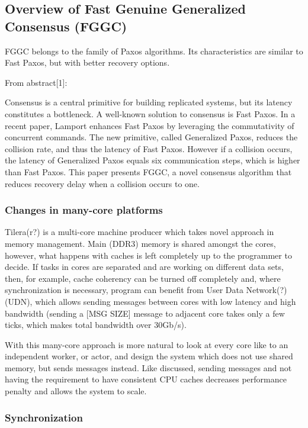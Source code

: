 \documentclass[english,11pt]{article}
\begin{document}
\subsection{Overview of Fast Genuine Generalized Consensus (FGGC)}

FGGC belongs to the family of Paxos algorithms. Its characteristics are similar
to Fast Paxos, but with better recovery options.

From abstract[1]:

Consensus is a central primitive for building replicated systems, but its
latency constitutes a bottleneck. A well-known solution to consensus is Fast
Paxos. In a recent paper, Lamport enhances Fast Paxos by leveraging the
commutativity of concurrent commands. The new primitive, called Generalized
Paxos, reduces the collision rate, and thus the latency of Fast Paxos. However
if a collision occurs, the latency of Generalized Paxos equals six
communication steps, which is higher than Fast Paxos. This paper presents FGGC,
a novel consensus algorithm that reduces recovery delay when a collision occurs
to one.

\subsubsection{Changes in many-core platforms}
\label{many-core}

Tilera(r?) is a multi-core machine producer which takes novel approach in
memory management. Main (DDR3) memory is shared amongst the cores, however,
what happens with caches is left completely up to the programmer to decide.  If
tasks in cores are separated and are working on different data sets, then, for
example, cache coherency can be turned off completely and, where
synchronization is necessary, program can benefit from User Data Network(?)
(UDN), which allows sending messages between cores with low latency and high
bandwidth (sending a [MSG SIZE] message to adjacent core takes only a few ticks,
which makes total bandwidth over 30Gb/s).

With this many-core approach is more natural to look at every core like to an
independent worker, or actor, and design the system which does not use shared
memory, but sends messages instead. Like discussed, sending messages and not
having the requirement to have consistent CPU caches decreases performance
penalty and allows the system to scale.

\subsubsection{Synchronization}
\end{document}

